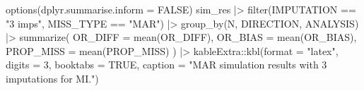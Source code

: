 \documentclass[
  letterpaper,
  DIV=11,
  numbers=noendperiod]{scrartcl}
\newenvironment{Shaded}{\begin{snugshade}}{\end{snugshade}}
\newcommand{\AttributeTok}[1]{\textcolor[rgb]{0.40,0.45,0.13}{#1}}
\newcommand{\ConstantTok}[1]{\textcolor[rgb]{0.56,0.35,0.01}{#1}}
\newcommand{\DecValTok}[1]{\textcolor[rgb]{0.68,0.00,0.00}{#1}}
\newcommand{\FunctionTok}[1]{\textcolor[rgb]{0.28,0.35,0.67}{#1}}
\newcommand{\NormalTok}[1]{\textcolor[rgb]{0.00,0.23,0.31}{#1}}
\newcommand{\OtherTok}[1]{\textcolor[rgb]{0.00,0.23,0.31}{#1}}
\newcommand{\SpecialCharTok}[1]{\textcolor[rgb]{0.37,0.37,0.37}{#1}}
\newcommand{\StringTok}[1]{\textcolor[rgb]{0.13,0.47,0.30}{#1}}
\begin{document}
\begin{Shaded}
\end{Shaded}

\begin{Shaded}
\begin{Highlighting}[]
\FunctionTok{options}\NormalTok{(}\AttributeTok{dplyr.summarise.inform =} \ConstantTok{FALSE}\NormalTok{)}
\NormalTok{sim\_res }\SpecialCharTok{|\textgreater{}} 
  \FunctionTok{filter}\NormalTok{(IMPUTATION }\SpecialCharTok{==} \StringTok{"3 imps"}\NormalTok{, }
\NormalTok{         MISS\_TYPE }\SpecialCharTok{==} \StringTok{"MAR"}\NormalTok{) }\SpecialCharTok{|\textgreater{}}
  \FunctionTok{group\_by}\NormalTok{(N, DIRECTION, ANALYSIS) }\SpecialCharTok{|\textgreater{}}
  \FunctionTok{summarize}\NormalTok{(}
    \AttributeTok{OR\_DIFF =} \FunctionTok{mean}\NormalTok{(OR\_DIFF),}
    \AttributeTok{OR\_BIAS =} \FunctionTok{mean}\NormalTok{(OR\_BIAS),}
    \AttributeTok{PROP\_MISS =} \FunctionTok{mean}\NormalTok{(PROP\_MISS)}
\NormalTok{  ) }\SpecialCharTok{|\textgreater{}} 
\NormalTok{  kableExtra}\SpecialCharTok{::}\FunctionTok{kbl}\NormalTok{(}\AttributeTok{format =} \StringTok{"latex"}\NormalTok{, }
                  \AttributeTok{digits =} \DecValTok{3}\NormalTok{, }
                  \AttributeTok{booktabs =} \ConstantTok{TRUE}\NormalTok{,}
                  \AttributeTok{caption =} \StringTok{"MAR simulation results with 3 imputations for MI."}\NormalTok{)}
\end{Highlighting}
\end{Shaded}
\end{document}
